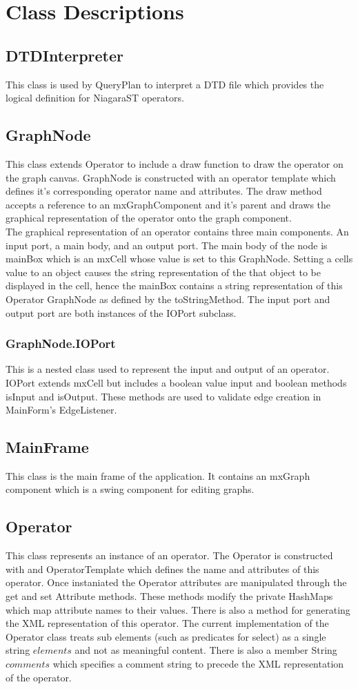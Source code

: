 \documentclass{article}
\begin{document}
\section{Class Descriptions}
\subsection{DTDInterpreter} This class is used by QueryPlan to interpret a DTD file which provides the logical definition for NiagaraST operators.
\subsection{GraphNode} This class extends Operator to include a draw function to draw the operator on the graph canvas.  GraphNode is constructed with an operator template which defines it's corresponding operator name and attributes.  The draw method accepts a reference to an mxGraphComponent and it's parent and draws the graphical representation of the operator onto the graph component.\\
The graphical representation of an operator contains three main components.  An input port, a main body, and an output port.  The main body of the node is mainBox which is an mxCell whose value is set to this GraphNode.  Setting a cells value to an object causes the string representation of the that object to be displayed in the cell, hence the mainBox contains a string representation of this Operator GraphNode as defined by the toStringMethod.  The input port and output port are both instances of the IOPort subclass.
\subsubsection{GraphNode.IOPort} This is a nested class used to represent the input and output of an operator.  IOPort extends mxCell but includes a boolean value input and boolean methods isInput and isOutput.  These methods are used to validate edge creation in MainForm's EdgeListener.
\subsection{MainFrame} This class is the main frame of the application.  It contains an mxGraph component which is a swing component for editing graphs.
\subsection{Operator} This class represents an instance of an operator.  The Operator is constructed with and OperatorTemplate which defines the name and attributes of this operator.  Once instaniated the Operator attributes are manipulated through the get and set Attribute methods.  These methods modify the private HashMaps which map attribute names to their values.  There is also a method for generating the XML representation of this operator.  The current implementation of the Operator class treats sub elements (such as predicates for select) as a single string $elements$ and not as meaningful content.  There is also a member String $comments$ which specifies a comment string to precede the XML representation of the operator.
\end{document}
